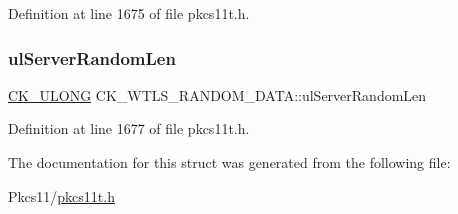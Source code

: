 Definition at line 1675 of file pkcs11t.\+h.

\mbox{\label{struct_c_k___w_t_l_s___r_a_n_d_o_m___d_a_t_a_a7701c5a19b31181433fe42690e5a3e4b}} 
\subsubsection{\texorpdfstring{ul\+Server\+Random\+Len}{ulServerRandomLen}}
{\footnotesize\ttfamily \hyperlink{pkcs11t_8h_a35181858a3b7a0a81f49d180d8f446ef}{C\+K\+\_\+\+U\+L\+O\+NG} C\+K\+\_\+\+W\+T\+L\+S\+\_\+\+R\+A\+N\+D\+O\+M\+\_\+\+D\+A\+T\+A\+::ul\+Server\+Random\+Len}



Definition at line 1677 of file pkcs11t.\+h.



The documentation for this struct was generated from the following file\+:\begin{DoxyCompactItemize}
\item 
Pkcs11/\hyperlink{pkcs11t_8h}{pkcs11t.\+h}\end{DoxyCompactItemize}

